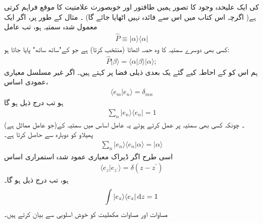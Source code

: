  کی ایک علیحدہ وجود کا تصور ہمیں طاقتور اور خوبصورت علامتیت کا موقع فراہم کرتی ہے( اگرچہ اس کتاب میں اس  سے فائدہ نہیں اٹھایا جائے گا) ۔ مثال کے طور پر، اگر   ایک معمول   شدہ  سمتیہ ہو،  تب عامل 
\begin{align}
\hat{P} \equiv | \alpha \rangle \langle \alpha | 
\end{align}
کسی بھی  دوسرے سمتیہ کا وہ حصہ اٹھاتا (منتخب کرتا) ہے  جو    کے"ساتھ ساتھ"  پایا جاتا ہو:
\begin{align*}
\hat{P} | \beta \rangle = \langle \alpha | \beta \rangle | \alpha \rangle ;
\end{align*}
ہم اس کو    کے  احاطہ کیے گئے یک بعدی ذیلی فضا پر   کہتے ہیں۔  اگر  غیر مسلسل معیاری عمودی اساس،
\begin{align}
\langle e_{m} | e_{n} \rangle = \delta_{mn}
\end{align}
ہو تب درج ذیل ہو گا 
\begin{align}\label{مساوات_قواعد_مکملیت_الف}
\sum_{n} | e_{n} \rangle \langle e_{n} | = 1 
\end{align}
(جو عامل مماثل ہے)۔ چونکہ کسی بھی سمتیہ  پر عمل کرتے ہوئے یہ عامل اساس  میں سمتیہ  کے پھیلاو  کو      دوبارہ  سے حاصل کرتا ہے۔ 
\begin{align}
\sum_{n} | e_{n} \rangle \langle e_{n} | \alpha \rangle = | \alpha \rangle 
\end{align}
اسی طرح اگر    ڈیراک معیاری عمود  شدہ استمراری اساس  
\begin{align}
\langle e_{z} | e_{z^{'}} \rangle = \delta ( z-z^{'})
\end{align}
ہو، تب درج ذیل ہو گا۔ 
\begin{align}\label{مساوات_قواعد_مکملیت_ب}
\int | e_{z} \rangle \langle e_{z} | \dif z = 1
\end{align}
 مساوات    اور مساوات   مکملیت   کو  خوش اسلوبی سے  بیان کرتے ہیں۔
 
